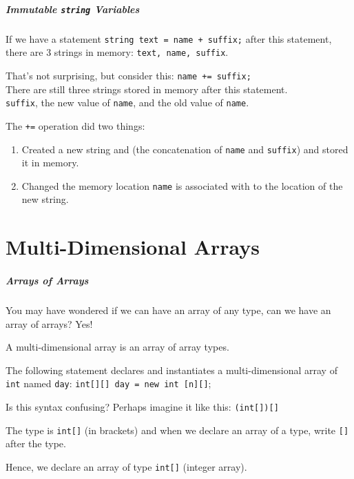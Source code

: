 \begin{frame}
\frametitle{Immutable \texttt{string} Variables}

If we have a statement \texttt{string text = name + suffix;} after this statement, there are 3 strings in memory: \texttt{text, name, suffix}.

That's not surprising, but consider this: \texttt{name += suffix;}\\
\quad There are still three strings stored in memory after this statement.\\
\quad \texttt{suffix}, the new value of \texttt{name}, and the old value of \texttt{name}.

The \texttt{+=} operation did two things: 
\begin{enumerate}
\item Created a new string and (the concatenation of \texttt{name} and \texttt{suffix}) and stored it in memory.
\item Changed the memory location \texttt{name} is associated with to the location of the new string.
\end{enumerate}

\end{frame}


\part{Multi-Dimensional Arrays}
\begin{frame}\partpage\end{frame}

\begin{frame}
\frametitle{Arrays of Arrays}

You may have wondered if we can have an array of any type, can we have an array of arrays? Yes!

A \alert{multi-dimensional array} is an array of array types.

The following statement declares and instantiates a multi-dimensional array of \texttt{int} named \texttt{day}: \texttt{int[][] day = new int [n][]};

Is this syntax confusing? Perhaps imagine it like this: \texttt{(int[])[]}

The type is \texttt{int[]} (in brackets) and when we declare an array of a type, write \texttt{[]} after the type.

Hence, we declare an array of type \texttt{int[]} (integer array).

\end{frame}

